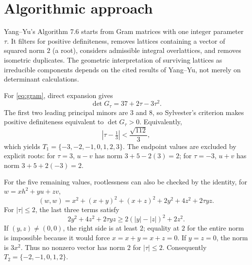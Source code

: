\documentclass[11pt]{article}
\begin{document}
\section{Algorithmic approach}
Yang--Yu's Algorithm 7.6 \cite[Algorithm 7.6]{YangYu} starts from Gram matrices with one integer parameter $\tau$. It filters for positive definiteness, removes lattices containing a vector of squared norm $2$ (a root), considers admissible integral overlattices, and removes isometric duplicates. The geometric interpretation of surviving lattices as irreducible components depends on the cited results of Yang--Yu, not merely on determinant calculations.

For \eqref{eq:gram}, direct expansion gives
\begin{equation}\label{eq:det}
\det G_\tau=37+2\tau-3\tau^2.
\end{equation}
The first two leading principal minors are $3$ and $8$, so Sylvester's criterion makes positive definiteness equivalent to $\det G_\tau>0$. Equivalently,
\[
\left|\tau-\tfrac13\right|<\frac{\sqrt{112}}3,
\]
which yields $T_1=\{-3,-2,-1,0,1,2,3\}$. The endpoint values are excluded by explicit roots: for $\tau=3$, $u-v$ has norm $3+5-2(3)=2$; for $\tau=-3$, $u+v$ has norm $3+5+2(-3)=2$.

For the five remaining values, rootlessness can also be checked by the identity, for $w=xh^2+yu+zv$,
\[
(w,w)=x^2+(x+y)^2+(x+z)^2+2y^2+4z^2+2\tau yz.
\]
For $|\tau|\le2$, the last three terms satisfy
\[
2y^2+4z^2+2\tau yz\ge 2(|y|-|z|)^2+2z^2.
\]
If $(y,z)\ne(0,0)$, the right side is at least $2$; equality at $2$ for the entire norm is impossible because it would force $x=x+y=x+z=0$. If $y=z=0$, the norm is $3x^2$. Thus no nonzero vector has norm $2$ for $|\tau|\le2$. Consequently $T_2=\{-2,-1,0,1,2\}$.
\end{document}

